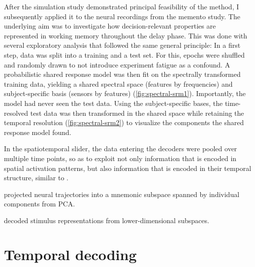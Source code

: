 After the simulation study demonstrated principal feasibility of the method, I subsequently applied it to the neural recordings from the memento study.
The underlying aim was to investigate how decision-relevant properties are represented in working memory throughout the delay phase.
This was done with several exploratory analysis that followed the same general principle:
In a first step, data was split into a training and a test set.
For this, epochs were shuffled and randomly drawn to not introduce experiment fatigue as a confound.
A probabilistic shared response model was then fit on the spectrally transformed training data, yielding a shared spectral space (features by frequencies) and subject-specific basis (sensors by features) (\ref{fig:spectral-srm1}).
Importantly, the model had never seen the test data.
Using the subject-specific bases, the time-resolved test data was then transformed in the shared space while retaining the temporal resolution (\ref{fig:spectral-srm2}) to visualize the components the shared response model found.



In the spatiotemporal slider, the data entering the decoders were pooled over multiple time points, so as to exploit not only information that is encoded in spatial activation patterns, but also information that is encoded in their temporal structure, similar to \citep{muhle2021hierarchy}.


\citet{murray2017stable} projected neural trajectories into a mnemonic subspace spanned by individual components from PCA.

\citet{murray2017stable} decoded stimulus representations from lower-dimensional subspaces.

\pagebreak

\section{Temporal decoding}
\label{decoding}


